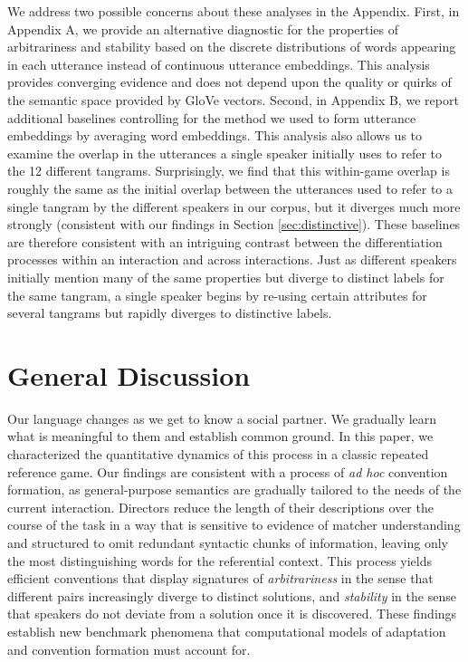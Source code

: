 \documentclass[alpha-refs]{wiley-article}
\begin{document}
We address two possible concerns about these analyses in the Appendix.
First, in Appendix A, we provide an alternative diagnostic for the properties of arbitrariness and stability based on the discrete distributions of words appearing in each utterance instead of continuous utterance embeddings.
This analysis provides converging evidence and does not depend upon the quality or quirks of the semantic space provided by GloVe vectors.
Second, in Appendix B, we report additional baselines controlling for the method we used to form utterance embeddings by averaging word embeddings.
This analysis also allows us to examine the overlap in the utterances a single speaker initially uses to refer to the 12 different tangrams.
Surprisingly, we find that this within-game overlap is roughly the same as the initial overlap between the utterances used to refer to a single tangram by the different speakers in our corpus, but it diverges much more strongly (consistent with our findings in Section \ref{sec:distinctive}).
These baselines are therefore consistent with an intriguing contrast between the differentiation processes within an interaction and across interactions.
Just as different speakers initially mention many of the same properties but diverge to distinct labels for the same tangram, a single speaker begins by re-using certain attributes for several tangrams but rapidly diverges to distinctive labels.

\section{General Discussion}
\label{sec:discussion}

Our language changes as we get to know a social partner.
We gradually learn what is meaningful to them and establish common ground.
In this paper, we characterized the quantitative dynamics of this process in a classic repeated reference game.
Our findings are consistent with a process of \emph{ad hoc} convention formation, as general-purpose semantics are gradually tailored to the needs of the current interaction.
Directors reduce the length of their descriptions over the course of the task in a way that is sensitive to evidence of matcher understanding and structured to omit redundant syntactic chunks of information, leaving only the most distinguishing words for the referential context.
This process yields efficient conventions that display signatures of \emph{arbitrariness} in the sense that different pairs increasingly diverge to distinct solutions, and \emph{stability} in the sense that speakers do not deviate from a solution once it is discovered.
These findings establish new benchmark phenomena that computational models of adaptation and convention formation must account for.
\end{document}
